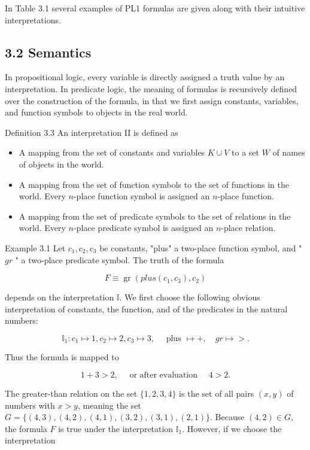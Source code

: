 \documentclass[10pt]{book}
\begin{document}
In Table 3.1 several examples of PL1 formulas are given along with their intuitive interpretations.

\subsection*{3.2 Semantics}
In propositional logic, every variable is directly assigned a truth value by an interpretation. In predicate logic, the meaning of formulas is recursively defined over the construction of the formula, in that we first assign constants, variables, and function symbols to objects in the real world.

Definition 3.3 An interpretation II is defined as

\begin{itemize}
  \item A mapping from the set of constants and variables $K \cup V$ to a set $W$ of names of objects in the world.
  \item A mapping from the set of function symbols to the set of functions in the world. Every $n$-place function symbol is assigned an $n$-place function.
  \item A mapping from the set of predicate symbols to the set of relations in the world. Every $n$-place predicate symbol is assigned an $n$-place relation.
\end{itemize}

Example 3.1 Let $c_{1}, c_{2}, c_{3}$ be constants, "plus" a two-place function symbol, and " $g r$ " a two-place predicate symbol. The truth of the formula

$$
F \equiv \operatorname{gr}\left(p l u s\left(c_{1}, c_{3}\right), c_{2}\right)
$$

depends on the interpretation $\mathbb{I}$. We first choose the following obvious interpretation of constants, the function, and of the predicates in the natural numbers:

$$
\mathbb{I}_{1}: c_{1} \mapsto 1, c_{2} \mapsto 2, c_{3} \mapsto 3, \quad \text { plus } \mapsto+, \quad g r \mapsto>.
$$

Thus the formula is mapped to

$$
1+3>2, \quad \text { or after evaluation } \quad 4>2 .
$$

The greater-than relation on the set $\{1,2,3,4\}$ is the set of all pairs $(x, y)$ of numbers with $x>y$, meaning the set $G=\{(4,3),(4,2),(4,1),(3,2),(3,1),(2,1)\}$. Because $(4,2) \in G$, the formula $F$ is true under the interpretation $\mathbb{I}_{1}$. However, if we choose the interpretation
\end{document}
